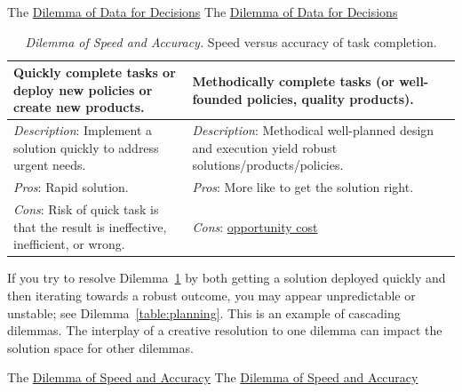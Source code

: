 The \href{table:single-bit-decision}{Dilemma of Data for Decisions}
The \href{table:single-bit-decision}{Dilemma of Data for Decisions}

\begin{center}
\begin{table}[H] %
\begin{tabular}{ | m{\dilemmatablewidth}| m{\dilemmatablewidth} | } 
  \hline
  \textbf{Quickly complete tasks or deploy new policies or create new products.} & 
  \textbf{Methodically complete tasks (or well-founded policies, quality products).} \\ 
  \hline
  \textit{Description}: Implement a solution quickly to address urgent needs. &
  \textit{Description}: Methodical well-planned design and execution yield robust solutions/products/policies. \\
  \hline
  \textit{Pros}: Rapid solution. &
  \textit{Pros}: More like to get the solution right. \\
  \hline
  \textit{Cons}: Risk of quick task is that the result is ineffective, inefficient, or wrong. &
  \textit{Cons}: \href{https://en.wikipedia.org/wiki/Opportunity_cost}{opportunity cost} \\  
  \hline
\end{tabular}
\caption{
\textit{Dilemma of Speed and Accuracy.}
Speed versus accuracy of task completion.
}
\label{table:quick-methodical}
\end{table}
\end{center}

If you try to resolve Dilemma~\ref{table:quick-methodical} by both getting a solution deployed quickly and then iterating towards a robust outcome, you may appear unpredictable or unstable; see Dilemma~\ref{table:planning}. This is an example of cascading dilemmas. The interplay of a creative resolution to one dilemma can impact the solution space for other dilemmas. 

The \href{table:quick-methodical}{Dilemma of Speed and Accuracy}
The \href{table:quick-methodical}{Dilemma of Speed and Accuracy}


